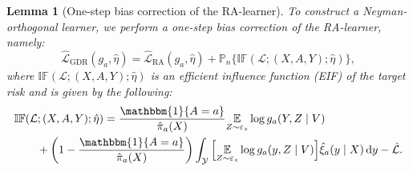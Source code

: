 \documentclass[dvipsnames]{article} %
\newcommand*\diff{\mathop{}\!\mathrm{d}}
\newtheorem{lemma}{Lemma}
\begin{document}
\begin{lemma}[One-step bias correction of the RA-learner] \label{lemma:bias-correction}
    To construct a Neyman-orthogonal learner, we perform a one-step bias correction of the RA-learner, namely:
    \begin{equation}
        \hat{\mathcal{L}}_\text{GDR}(g_a, \hat{\eta}) = \hat{\mathcal{L}}_\text{RA}(g_a, \hat{\eta}) + \mathbb{P}_n\Big\{ \mathbb{IF}(\mathcal{L}; (X, A, Y); \hat{\eta}) \Big\},
    \end{equation}
    where $\mathbb{IF}(\mathcal{L}; (X, A, Y); \hat{\eta})$ is an efficient influence function (EIF) \citep{kennedy2024semiparametric} of the target risk and is given by the following:
    \begin{align}
        & \mathbb{IF}(\mathcal{L}; (X, A, Y); \hat{\eta}) =   \frac{\mathbbm{1}\{A = a\}}{\hat{\pi}_a(X)} \underset{Z \sim \varepsilon_z }{\mathbb{E}} \log g_a(Y, Z \mid V) \\
        & \quad  \quad + \bigg(1 - \frac{\mathbbm{1}\{A = a\}} {\hat{\pi}_a(X)}\bigg) \int_\mathcal{Y} \Big[\underset{Z \sim \varepsilon_z }{\mathbb{E}} \log g_a(y, Z \mid V)\Big] \hat{\xi}_a(y\mid X) \diff{y} - \hat{\mathcal{L}}. \nonumber
    \end{align}
\end{lemma}
\end{document}
